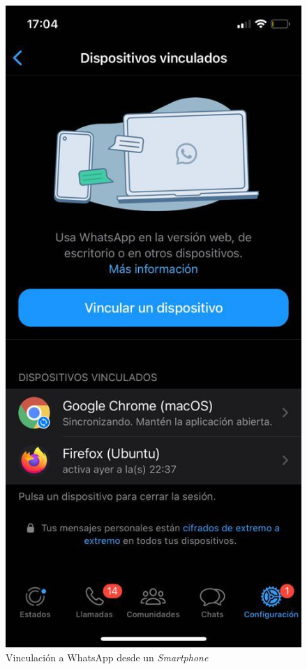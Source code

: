 \begin{figure}[H]
	\centering
	\includegraphics[scale=.30]{./Figures/ensayo-1/15.qr-api.jpeg}
	\caption{Vinculación a WhatsApp desde un \textit{Smartphone}}
	\label{fig:ensayomensaje1}
\end{figure}

